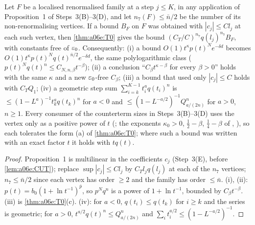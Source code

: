 \begin{lemma}\label{lem:a06e:T1}
Let $F$ be a localised renormalised family at a step $j\le K$, in any application of Proposition~1 of Steps~3(B)--3(D), and let $n_7(F)\le\bar n/2$ be the number of its non-renormalising \cite[(1.7)]{Ba3} vertices. If a bound $B_F$ on $F$ was obtained with $|c_j|\le Cl_j$ at each such vertex, then \cref{thm:a06e:T0} gives the bound $(C_T/C)^{n_7}q(l_j)^{n_7}B_F$, with constants free of $\varepsilon_0$. Consequently: \textup{(i)} a bound $O(1)t^\kappa p(t)^Ne^{-\delta d}$ becomes $O(1)t^\kappa p(t)^Nq(t)^{\bar n/2}e^{-\delta d}$, the same polylogarithmic class ($p(t)^Nq(t)^n\le C_{N,n,\beta}t^{-\beta}$); \textup{(ii)} a conclusion ``$C_\beta t^{\kappa-\beta}$ for every $\beta>0$'' holds with the same $\kappa$ and a new $\varepsilon_0$-free $C_\beta$; \textup{(iii)} a bound that used only $|c_j|\le C$ holds with $C_TQ_1$; \textup{(iv)} a geometric step sum $\sum_{i=k}^{K-1}t_i^aq(t_i)^n$ is $\le(1-L^a)^{-1}t_k^aq(t_k)^n$ for $a<0$ and $\le(1-L^{-a/2})^{-1}Q^n_{a/(2n)}$ for $a>0$, $n\ge1$. Every consumer of the counterterm sizes in Steps~3(B)--3(D) uses the \cite[(1.7)]{Ba3} vertex only as a positive power of $t$ (\cite[p.~421]{Ba3}; the exponents $\kappa_0>0$, $\frac12-\beta$, $\frac14-\beta$ of \cite[(3.58)]{Ba1}, \cite[(2.57), (2.116)--(2.117)]{Ba2}), so each tolerates the form \textup{(a)} of \cref{thm:a06e:T0}; where such a bound was written with an exact factor $t$ it holds with $tq(t)$.
\end{lemma}

\begin{proof}
Proposition~1 is multilinear in the coefficients $c_j$ (Step~3(E), before \cref{lem:a06e:CUT}); replace $\sup|c_j|\le Cl_j$ by $C_Tl_jq(l_j)$ at each of the $n_7$ vertices; $n_7\le\bar n/2$ since each \cite[(1.7)]{Ba3} vertex has order $\ge2$ and the family has order $\le\bar n$. (i), (ii): $p(t)=b_0(1+\ln t^{-1})^{\bar p}$, so $p^Nq^n$ is a power of $1+\ln t^{-1}$, bounded by $C_\beta t^{-\beta}$. (iii) is \cref{thm:a06e:T0}(c). (iv): for $a<0$, $q(t_i)\le q(t_k)$ for $i\ge k$ and the series is geometric; for $a>0$, $t^{a/2}q(t)^n\le Q^n_{a/(2n)}$ and $\sum_it_i^{a/2}\le(1-L^{-a/2})^{-1}$.
\end{proof}
